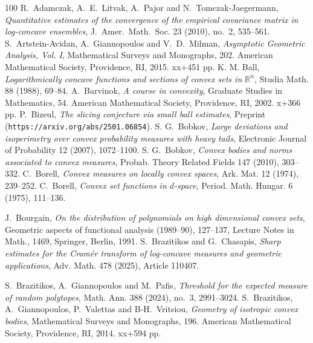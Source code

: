 \documentclass[11pt,leqno]{article}
\theoremstyle{definition}
\theoremstyle{remark}
\numberwithin{equation}{section}
\newcommand{\1}{\textbf{1}}
\begin{document}
\bigskip


\footnotesize

\begin{thebibliography}{100}
\footnotesize
{} \textrm{R.\ Adamczak, A.~E.\ Litvak, A.\ Pajor and N.\ Tomczak-Jaegermann},
\textit{Quantitative estimates of the convergence of the empirical covariance matrix in log-concave ensembles},
J.\ Amer.\ Math.\ Soc. {23} (2010), no.~2, 535--561.
 \textrm{S.\ Artstein-Avidan, A.\ Giannopoulos and V.\ D.\ Milman}, \textit{Asymptotic Geometric Analysis,
Vol. I}, Mathematical Surveys and Monographs, 202. American Mathematical Society, Providence, RI, 2015. xx+451 pp.
 \textrm{K. M. Ball}, \textit{Logarithmically concave functions and sections of convex sets in ${\mathbb R}^n$},
Studia Math. {88} (1988), 69--84.
 \textrm{A.\ Barvinok}, \textit{A course in convexity}, Graduate Studies in Mathematics, 54. American
Mathematical Society, Providence, RI, 2002. x+366 pp.
 \textrm{P.\ Bizeul}, \textit{The slicing conjecture via small ball estimates},
Preprint ({\tt https://arxiv.org/abs/2501.06854}).
 \textrm{S. G.\ Bobkov}, \textit{Large deviations and isoperimetry over convex
probability measures with heavy tails}, Electronic Journal of Probability {12} (2007), 1072--1100.
 \textrm{S. G.\ Bobkov}, \textit{Convex bodies and norms associated to convex measures},
Probab. Theory Related Fields {147} (2010), 303--332.
 \textrm{C.\ Borell}, \textit{Convex measures on locally convex spaces},
Ark. Mat. {12} (1974), 239--252.
 \textrm{C.\ Borell}, \textit{Convex set functions in $d$-space},
Period. Math. Hungar. {6} (1975), 111--136.

 \textrm{J.\ Bourgain}, \textit{On the distribution of polynomials on high dimensional convex sets},
Geometric aspects of functional analysis (1989–90), 127--137, Lecture Notes in Math., 1469, Springer, Berlin, 1991.
 \textrm{S.\ Brazitikos and G.\ Chasapis}, \textit{Sharp estimates for the Cram\'{e}r transform
of  log-concave  measures and  geometric  applications},  Adv. Math. 478 (2025), Article 110407.

 \textrm{S.\ Brazitikos, A.\ Giannopoulos and M.\ Pafis}, \textit{Threshold for the expected measure
of random polytopes}, Math. Ann. {388} (2024), no.~3, 2991--3024.
 \textrm{S.\ Brazitikos, A.\ Giannopoulos, P.\ Valettas and B-H.\ Vritsiou}, \textit{Geometry of isotropic
convex bodies}, Mathematical Surveys and Monographs, 196. American Mathematical Society, Providence, RI, 2014. xx+594 pp.


\end{thebibliography}
\end{document}

